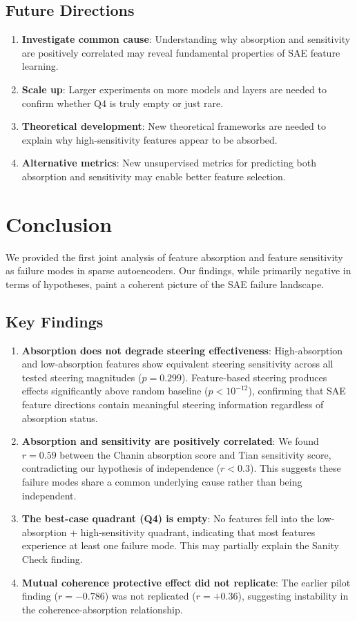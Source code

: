 \documentclass{article}
\begin{document}
\subsection{Future Directions}

\begin{enumerate}
  \item \textbf{Investigate common cause}: Understanding why absorption and sensitivity are positively correlated may reveal fundamental properties of SAE feature learning.
  \item \textbf{Scale up}: Larger experiments on more models and layers are needed to confirm whether Q4 is truly empty or just rare.
  \item \textbf{Theoretical development}: New theoretical frameworks are needed to explain why high-sensitivity features appear to be absorbed.
  \item \textbf{Alternative metrics}: New unsupervised metrics for predicting both absorption and sensitivity may enable better feature selection.
\end{enumerate}

\section{Conclusion}

We provided the first joint analysis of feature absorption and feature sensitivity as failure modes in sparse autoencoders. Our findings, while primarily negative in terms of hypotheses, paint a coherent picture of the SAE failure landscape.

\subsection{Key Findings}

\begin{enumerate}
  \item \textbf{Absorption does not degrade steering effectiveness}: High-absorption and low-absorption features show equivalent steering sensitivity across all tested steering magnitudes ($p = 0.299$). Feature-based steering produces effects significantly above random baseline ($p < 10^{-12}$), confirming that SAE feature directions contain meaningful steering information regardless of absorption status.
  \item \textbf{Absorption and sensitivity are positively correlated}: We found $r = 0.59$ between the Chanin absorption score and Tian sensitivity score, contradicting our hypothesis of independence ($r < 0.3$). This suggests these failure modes share a common underlying cause rather than being independent.
  \item \textbf{The best-case quadrant (Q4) is empty}: No features fell into the low-absorption + high-sensitivity quadrant, indicating that most features experience at least one failure mode. This may partially explain the Sanity Check finding.
  \item \textbf{Mutual coherence protective effect did not replicate}: The earlier pilot finding ($r = -0.786$) was not replicated ($r = +0.36$), suggesting instability in the coherence-absorption relationship.
\end{enumerate}
\end{document}
